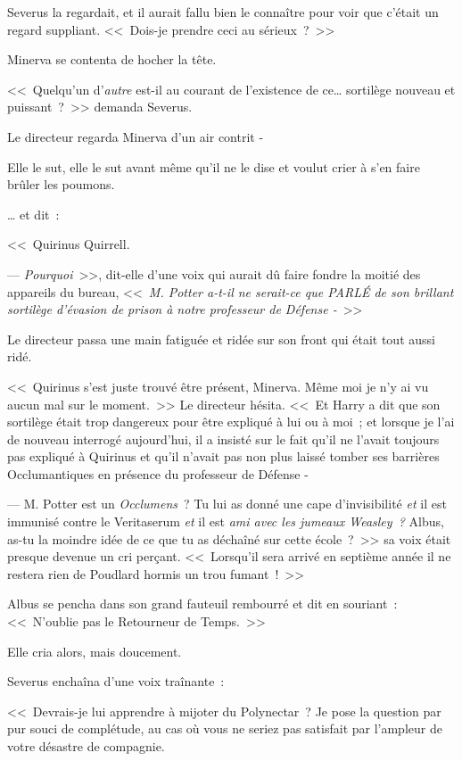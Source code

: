 Severus la regardait, et il aurait fallu bien le connaître pour voir que c'était un regard suppliant. <<~Dois-je prendre ceci au sérieux~?~>>

Minerva se contenta de hocher la tête.

<<~Quelqu'un d'\emph{autre} est-il au courant de l'existence de ce… sortilège nouveau et puissant~?~>> demanda Severus.

Le directeur regarda Minerva d'un air contrit -

Elle le sut, elle le sut avant même qu'il ne le dise et voulut crier à s'en faire brûler les poumons.

… et dit~:

<<~Quirinus Quirrell.

--- \emph{Pourquoi}~>>, dit-elle d'une voix qui aurait dû faire fondre la moitié des appareils du bureau, <<~\emph{M. Potter a-t-il ne serait-ce que PARLÉ de son brillant sortilège d'évasion de prison à notre professeur de Défense -}~>>

Le directeur passa une main fatiguée et ridée sur son front qui était tout aussi ridé.

<<~Quirinus s'est juste trouvé être présent, Minerva. Même moi je n'y ai vu aucun mal sur le moment.~>> Le directeur hésita. <<~Et Harry a dit que son sortilège était trop dangereux pour être expliqué à lui ou à moi~; et lorsque je l'ai de nouveau interrogé aujourd'hui, il a insisté sur le fait qu'il ne l'avait toujours pas expliqué à Quirinus et qu'il n'avait pas non plus laissé tomber ses barrières Occlumantiques en présence du professeur de Défense -

--- M. Potter est un \emph{Occlumens}~? Tu lui as donné une cape d'invisibilité \emph{et} il est immunisé contre le Veritaserum \emph{et} il est \emph{ami avec les jumeaux Weasley~?} Albus, as-tu la moindre idée de ce que tu as déchaîné sur cette école~?~>> sa voix était presque devenue un cri perçant. <<~Lorsqu'il sera arrivé en septième année il ne restera rien de Poudlard hormis un trou fumant~!~>>

Albus se pencha dans son grand fauteuil rembourré et dit en souriant~: <<~N'oublie pas le Retourneur de Temps.~>>

Elle cria alors, mais doucement.

Severus enchaîna d'une voix traînante~:

<<~Devrais-je lui apprendre à mijoter du Polynectar~? Je pose la question par pur souci de complétude, au cas où vous ne seriez pas satisfait par l'ampleur de votre désastre de compagnie.


